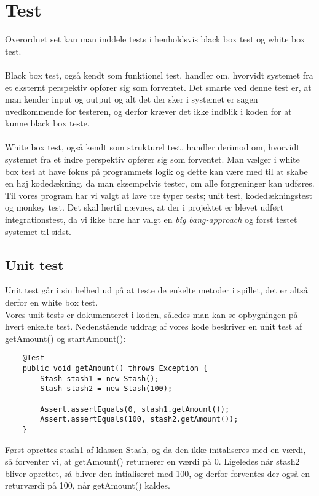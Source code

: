 \chapter{Test}
Overordnet set kan man inddele tests i henholdsvis black box test og white box test.\\\\
Black box test, også kendt som funktionel test, handler om, hvorvidt systemet fra et eksternt perspektiv opfører sig som forventet.
Det smarte ved denne test er, at man kender input og output og alt det der sker i systemet er sagen uvedkommende for testeren, og derfor kræver det ikke indblik i koden for at kunne black box teste.\\\\
White box test, også kendt som strukturel test, handler derimod om, hvorvidt systemet fra et indre perspektiv opfører sig som forventet.
Man vælger i white box test at have fokus på programmets logik og dette kan være med til at skabe en høj kodedækning, da man eksempelvis tester, om alle forgreninger kan udføres.
\\Til vores program har vi valgt at lave tre typer tests; unit test, kodedækningstest og monkey test.
Det skal hertil nævnes, at der i projektet er blevet udført integrationstest, da vi ikke bare har valgt en \textit{big bang-approach} og først testet systemet til sidst.
\section{Unit test}
Unit test går i sin helhed ud på at teste de enkelte metoder i spillet, det er altså derfor en white box test. \\
Vores unit tests er dokumenteret i koden, således man kan se opbygningen på hvert enkelte test.
Nedenstående uddrag af vores kode beskriver en unit test af getAmount() og startAmount():\\
\begin{lstlisting}
    @Test
    public void getAmount() throws Exception {
        Stash stash1 = new Stash();
        Stash stash2 = new Stash(100);

        Assert.assertEquals(0, stash1.getAmount());
        Assert.assertEquals(100, stash2.getAmount());
    }
\end{lstlisting}

\pagebreak
Først oprettes stash1 af klassen Stash, og da den ikke initaliseres med en værdi, så forventer vi, at getAmount() returnerer en værdi på 0.
Ligeledes når stash2 bliver oprettet, så bliver den intialiseret med 100, og derfor forventes der også en returværdi på 100, når getAmount() kaldes.


